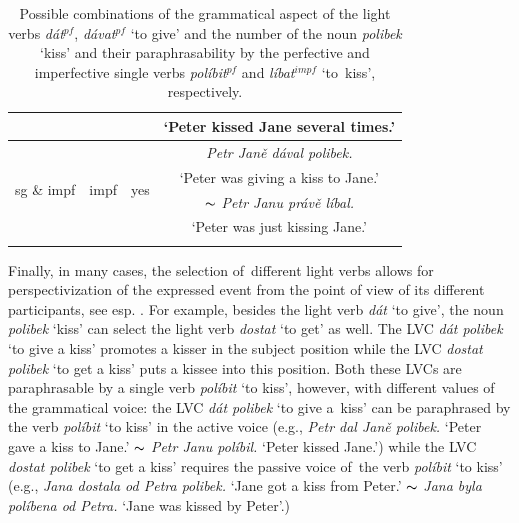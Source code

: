 \documentclass[output=paper
,modfonts
,nonflat]{langsci/langscibook}
\begin{document}
\begin{table}[tb]
\begin{tabular}{lccc}
                                  &                       &                        &     `Peter kissed Jane several times.' \\ \midrule
		\multirow{4}{*}{sg \& impf} & \multirow{4}{*}{impf}   & \multirow{4}{*}{yes}  &   \textit{Petr Janě dával polibek.} \\
		                            &                       &                       &   `Peter was giving a kiss to Jane.' \\ 
		                            &                       &                       &   $\thicksim$ \textit{Petr Janu právě líbal.}  \\
		                            &                       &                       &    `Peter was just kissing Jane.'\\    
	\lspbottomrule       
	\end{tabular}
	\caption{Possible combinations of the grammatical aspect of the light verbs 
	\textit{dát}$^{pf}$, \textit{dávat}$^{pf}$ `to give' and the number of the 
	noun \textit{polibek} `kiss' and their paraphrasability by the perfective and 
	imperfective single verbs \textit{políbit}$^{pf}$ and \textit{líbat}$^{impf}$ 
	`to~kiss', respectively.}
	\label{aspect}
\end{table}

	
Finally, in many cases, the selection of~different light verbs allows for 
 perspectivization of the expressed event from the point of view of 
its different participants, see 
esp. \citet{depling-lvc-2015}. For example, besides the light verb \textit{dát} 
`to give', the noun \textit{polibek} `kiss' can select the light verb 
\textit{dostat} `to get' as well. The LVC \textit{dát polibek} `to give a kiss' 
promotes a kisser in the subject position while 
the LVC \textit{dostat polibek} `to get a kiss' puts a kissee into this position. Both these LVCs are paraphrasable by a single verb \textit{políbit} `to kiss', however, with different values of the 
grammatical voice: the LVC \textit{dát polibek} `to give a~kiss' 
can be paraphrased by the verb \textit{políbit} `to kiss' in the active voice  
(e.g., \textit{Petr dal Janě polibek.} `Peter gave a kiss to Jane.' $\thicksim$ 
\textit{Petr Janu políbil.} `Peter kissed Jane.') while the LVC \textit{dostat 
polibek} `to get a kiss' requires the passive voice of~the verb \textit{políbit} 
`to kiss' (e.g., \textit{Jana dostala od Petra polibek.} `Jane got a kiss from 
Peter.' $\thicksim$ \textit{Jana byla políbena od Petra.} `Jane was kissed by Peter'.)
\end{document}
